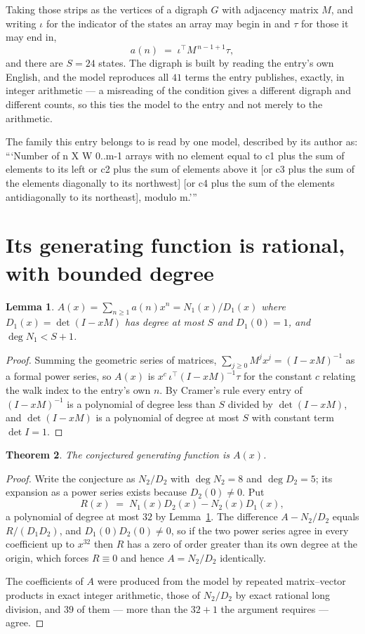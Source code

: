 \documentclass[11pt,a4paper]{article}
\theoremstyle{plain}
\newtheorem{theorem}{Theorem}
\newtheorem{lemma}[theorem]{Lemma}
\theoremstyle{definition}
\begin{document}
Taking those strips as the vertices of a digraph $G$ with adjacency matrix $M$, and writing
$\iota$ for the indicator of the states an array may begin in and $\tau$ for those it may end
in,
\[
a(n)\;=\;\iota^{\!\top}M^{\,n-1+1}\tau ,
\]
and there are $S=24$ states. The digraph is built by reading the entry's own English, and the
model reproduces all $41$ terms the entry publishes, exactly, in integer arithmetic --- a
misreading of the condition gives a different digraph and different counts, so this ties the
model to the entry and not merely to the arithmetic.

The family this entry belongs to is read by one model, described by its author as: ```Number of n X W 0..m-1 arrays with no element equal to c1 plus the sum of elements to its left or c2 plus the sum of elements above it [or c3 plus the sum of the elements diagonally to its northwest] [or c4 plus the sum of the elements antidiagonally to its northeast], modulo m.'''


\section{Its generating function is rational, with bounded degree}

\begin{lemma}\label{lem:rat}
$A(x)=\sum_{n\ge1}a(n)x^n=N_1(x)/D_1(x)$ where $D_1(x)=\det(I-xM)$ has degree at most
$S$ and $D_1(0)=1$, and $\deg N_1<S+1$.
\end{lemma}

\begin{proof}
Summing the geometric series of matrices, $\sum_{j\ge0}M^jx^j=(I-xM)^{-1}$ as a formal
power series, so $A(x)$ is $x^{c}\,\iota^{\!\top}(I-xM)^{-1}\tau$ for the constant $c$
relating the walk index to the entry's own $n$. By Cramer's rule every entry of
$(I-xM)^{-1}$ is a polynomial of degree less than $S$ divided by $\det(I-xM)$, and
$\det(I-xM)$ is a polynomial of degree at most $S$ with constant term $\det I=1$.
\end{proof}

\begin{theorem}
The conjectured generating function is $A(x)$.
\end{theorem}

\begin{proof}
Write the conjecture as $N_2/D_2$ with $\deg N_2=8$ and $\deg D_2=5$; its expansion as a
power series exists because $D_2(0)\neq0$. Put
\[
R(x)\;=\;N_1(x)D_2(x)-N_2(x)D_1(x),
\]
a polynomial of degree at most $32$ by Lemma~\ref{lem:rat}. The difference
$A-N_2/D_2$ equals $R/(D_1D_2)$, and $D_1(0)D_2(0)\neq0$, so if the two power series agree in
every coefficient up to $x^{32}$ then $R$ has a zero of order greater than its own
degree at the origin, which forces $R\equiv0$ and hence $A=N_2/D_2$ identically.

The coefficients of $A$ were produced from the model by repeated matrix--vector products in
exact integer arithmetic, those of $N_2/D_2$ by exact rational long division, and $39$
of them --- more than the $32+1$ the argument requires --- agree.
\end{proof}
\end{document}
